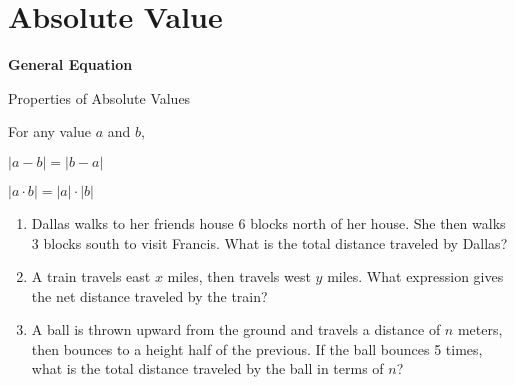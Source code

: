 \section{Absolute Value}

\bigskip
\textbf{General Equation}

\bigskip
\begin{equationbox}{Properties of Absolute Values}
\setlength{\columnseprule}{0pt}

For any value $a$ and $b$,

\begin{center}
\begin{multicols}{2}
$|a-b|=|b-a|$

$|a\cdot b|=|a|\cdot|b|$
\end{multicols}
\end{center}
\end{equationbox}

\bigskip
\begin{enumerate}[labelindent=*,style=multiline,leftmargin=*,label=\textbf{Example \arabic*:}]
\item Dallas walks to her friends house 6 blocks north of her house. She then walks 3 blocks south to visit Francis. What is the total distance traveled by Dallas?

\vfill\item A train travels east $x$ miles, then travels west $y$ miles. What expression gives the net distance traveled by the train?

\vfill\item A ball is thrown upward from the ground and travels a distance of $n$ meters, then bounces to a height half of the previous. If the ball bounces 5 times, what is the total distance traveled by the ball in terms of $n$?
\end{enumerate}

